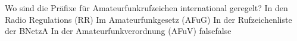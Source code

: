     {Wo sind die Präfixe für Amateurfunkrufzeichen international geregelt?}
    {In den Radio Regulations (RR)}
    {Im Amateurfunkgesetz (AFuG)}
    {In der Rufzeichenliste der BNetzA}
    {In der Amateurfunkverordnung (AFuV)}
    {false}{false}